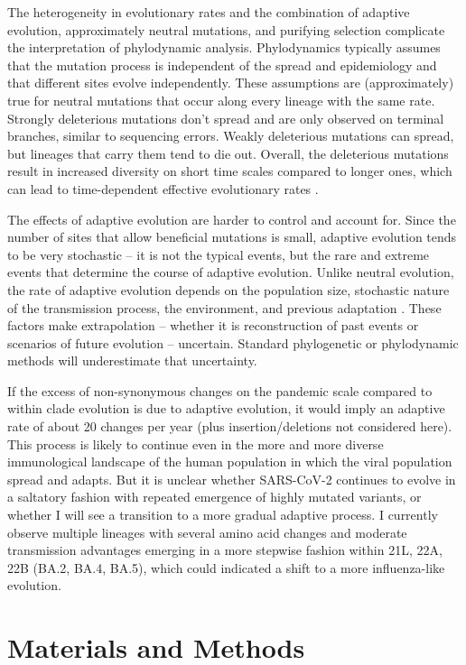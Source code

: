 \documentclass[aps,rmp, twocolumn]{revtex4}
\begin{document}
The heterogeneity in evolutionary rates and the combination of adaptive evolution, approximately neutral mutations, and purifying selection complicate the interpretation of phylodynamic analysis.
Phylodynamics typically assumes that the mutation process is independent of the spread and epidemiology and that different sites evolve independently.
These assumptions are (approximately) true for neutral mutations that occur along every lineage with the same rate.
Strongly deleterious mutations don't spread and are only observed on terminal branches, similar to sequencing errors.
Weakly deleterious mutations can spread, but lineages that carry them tend to die out.
Overall, the deleterious mutations result in increased diversity on short time scales compared to longer ones, which can lead to time-dependent effective evolutionary rates \citep{wertheim_purifying_2011}.

The effects of adaptive evolution are harder to control and account for.
Since the number of sites that allow beneficial mutations is small, adaptive evolution tends to be very stochastic -- it is not the typical events, but the rare and extreme events that determine the course of adaptive evolution.
Unlike neutral evolution, the rate of adaptive evolution depends on the population size, stochastic nature of the transmission process, the environment, and previous adaptation \citep{neher_genetic_2013}.
These factors make extrapolation -- whether it is reconstruction of past events or scenarios of future evolution -- uncertain.
Standard phylogenetic or phylodynamic methods will underestimate that uncertainty.

If the excess of non-synonymous changes on the pandemic scale compared to within clade evolution is due to adaptive evolution, it would imply an adaptive rate of about 20 changes per year (plus insertion/deletions not considered here).
This process is likely to continue even in the more and more diverse immunological landscape of the human population in which the viral population spread and adapts.
But it is unclear whether SARS-CoV-2 continues to evolve in a saltatory fashion with repeated emergence of highly mutated variants, or whether I will see a transition to a more gradual adaptive process.
I currently observe multiple lineages with several amino acid changes and moderate transmission advantages emerging in a more stepwise fashion within 21L, 22A, 22B (BA.2, BA.4, BA.5), which could indicated a shift to a more influenza-like evolution.

\section*{Materials and Methods}
\end{document}
